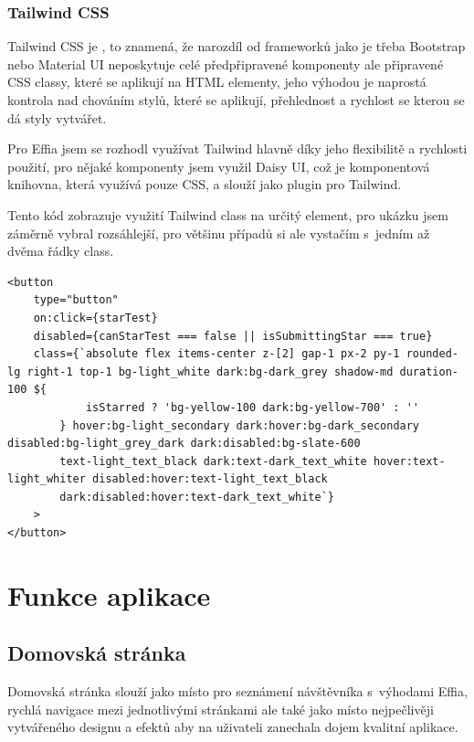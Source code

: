 \documentclass[12pt, a4paper,
openright
]{report}
\let\oldchapter\chapter
\renewcommand{\chapter}{
	\clearpage
	\pagestyle{fancy}
	\oldchapter
}
\begin{document}
\subsection{Tailwind CSS}
Tailwind CSS je , to znamená, že narozdíl od frameworků jako je třeba Bootstrap nebo Material UI neposkytuje celé předpřipravené komponenty ale připravené CSS classy, které se aplikují na HTML elementy, jeho výhodou je naprostá kontrola nad chováním stylů, které se aplikují, přehlednost a rychlost se kterou se dá styly vytvářet.

Pro Effia jsem se rozhodl využívat Tailwind hlavně díky jeho flexibilitě a rychlosti použití, pro nějaké komponenty jsem využil Daisy UI, což je komponentová knihovna, která využívá pouze CSS, a slouží jako plugin pro Tailwind.

Tento kód zobrazuje využití Tailwind class na určitý element, pro ukázku jsem záměrně vybral rozsáhlejší, pro většinu případů si ale vystačím s~jedním až dvěma řádky class.

\begin{lstlisting}[style=ES6, caption=Ukázka Tailwind kódu, label=tailwind-sample]
<button
	type="button"
	on:click={starTest}
	disabled={canStarTest === false || isSubmittingStar === true}
	class={`absolute flex items-center z-[2] gap-1 px-2 py-1 rounded-lg right-1 top-1 bg-light_white dark:bg-dark_grey shadow-md duration-100 ${
			isStarred ? 'bg-yellow-100 dark:bg-yellow-700' : ''
		} hover:bg-light_secondary dark:hover:bg-dark_secondary disabled:bg-light_grey_dark dark:disabled:bg-slate-600
		text-light_text_black dark:text-dark_text_white hover:text-light_whiter disabled:hover:text-light_text_black
		dark:disabled:hover:text-dark_text_white`}
	>
</button>
\end{lstlisting}

\chapter{Funkce aplikace}

\section{Domovská stránka}
Domovská stránka slouží jako místo pro seznámení návštěvníka s~výhodami Effia, rychlá navigace mezi jednotlivými stránkami ale také jako místo nejpečlivěji vytvářeného designu a efektů aby na uživateli zanechala dojem kvalitní aplikace.
\end{document}
